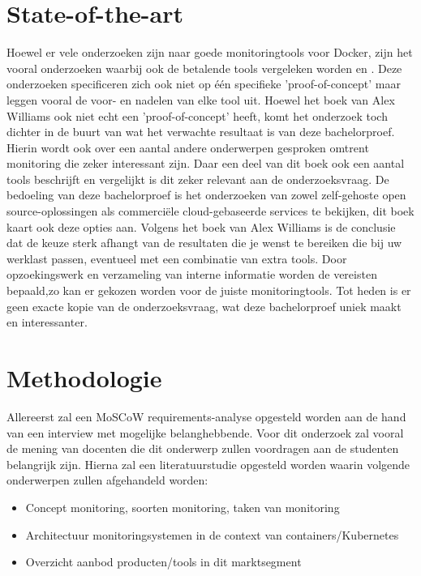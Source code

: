 
\section{State-of-the-art}
\label{sec:state-of-the-art}
Hoewel er vele onderzoeken zijn naar goede monitoringtools voor Docker, zijn het vooral onderzoeken waarbij ook de betalende tools vergeleken worden \autocite{Ribenzaft2020} en \autocite{Cirelly2020}. Deze onderzoeken specificeren zich ook niet op één specifieke 'proof-of-concept' maar leggen vooral de voor- en nadelen van elke tool uit. Hoewel het boek van Alex Williams \autocite{Cole2016} ook niet echt een 'proof-of-concept' heeft, komt het onderzoek toch dichter in de buurt van wat het verwachte resultaat is van deze bachelorproef. Hierin wordt ook over een aantal andere onderwerpen gesproken omtrent monitoring die zeker interessant zijn. Daar een deel van dit boek ook een aantal tools beschrijft en vergelijkt is dit zeker relevant aan de onderzoeksvraag. De bedoeling van deze bachelorproef is het onderzoeken van zowel zelf-gehoste open source-oplossingen als commerciële cloud-gebaseerde services te bekijken, dit boek kaart ook deze opties aan. Volgens het boek van Alex Williams \autocite{Cole2016} is de conclusie dat de keuze sterk afhangt van de resultaten die je wenst te bereiken die bij uw werklast passen, eventueel met een combinatie van extra tools. Door opzoekingswerk en verzameling van interne informatie worden de vereisten bepaald,zo kan er gekozen worden voor de juiste monitoringtools. Tot heden is er geen exacte kopie van de onderzoeksvraag, wat deze bachelorproef uniek maakt en interessanter.

\section{Methodologie}
\label{sec:methodologie}

Allereerst zal een MoSCoW requirements-analyse opgesteld worden aan de hand van een interview met mogelijke belanghebbende. Voor dit onderzoek zal vooral de mening van docenten die dit onderwerp zullen voordragen aan de studenten belangrijk zijn. Hierna zal een literatuurstudie opgesteld worden waarin volgende onderwerpen zullen afgehandeld worden:

\begin{itemize}
    \item Concept monitoring, soorten monitoring, taken van monitoring
    \item Architectuur monitoringsystemen in de context van containers/Kubernetes
    \item Overzicht aanbod producten/tools in dit marktsegment\\
\end{itemize}

